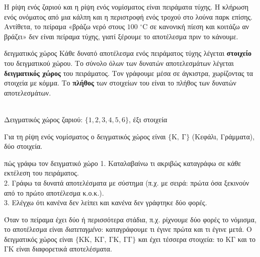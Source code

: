 Η ρίψη ενός ζαριού και η ρίψη ενός νομίσματος είναι πειράματα τύχης. Η κλήρωση ενός ονόματος από μια κάλπη και η περιστροφή ενός τροχού στο λούνα παρκ επίσης. Αντίθετα, το πείραμα «βράζω νερό στους $100$ $^\circ$C σε κανονική πίεση και κοιτάζω αν βράζει» δεν είναι πείραμα τύχης, γιατί ξέρουμε το αποτέλεσμα πριν το κάνουμε.

\begin{orismos}{δειγματικός χώρος}
Κάθε δυνατό αποτέλεσμα ενός πειράματος τύχης λέγεται \textbf{στοιχείο} του δειγματικού χώρου. Το σύνολο όλων των δυνατών αποτελεσμάτων λέγεται \textbf{δειγματικός χώρος} του πειράματος. Τον γράφουμε μέσα σε άγκιστρα, χωρίζοντας τα στοιχεία με κόμμα. Το \textbf{πλήθος} των στοιχείων του είναι το πλήθος των δυνατών αποτελεσμάτων.
\end{orismos}

\begin{center}
\hspace{0.5em}\hspace{0.5em}\hspace{0.5em}\hspace{0.5em}\hspace{0.5em}\\[1ex]
{\small Δειγματικός χώρος ζαριού: $\{1,2,3,4,5,6\}$, έξι στοιχεία}
\end{center}

Για τη ρίψη ενός νομίσματος ο δειγματικός χώρος είναι $\{\mathrm{Κ},\ \mathrm{Γ}\}$ (Κεφάλι, Γράμματα), δύο στοιχεία.

\begin{kanonas}{πώς γράφω τον δειγματικό χώρο}
1. Καταλαβαίνω τι ακριβώς καταγράφω σε κάθε εκτέλεση του πειράματος.\\
2. Γράφω τα δυνατά αποτελέσματα με σύστημα (π.χ. με σειρά: πρώτα όσα ξεκινούν από το πρώτο αποτέλεσμα κ.ο.κ.).\\
3. Ελέγχω ότι κανένα δεν λείπει και κανένα δεν γράφτηκε δύο φορές.
\end{kanonas}

Όταν το πείραμα έχει δύο ή περισσότερα στάδια, π.χ. ρίχνουμε δύο φορές το νόμισμα, το αποτέλεσμα είναι \emph{διατεταγμένο}: καταγράφουμε τι έγινε πρώτα και τι έγινε μετά. Ο δειγματικός χώρος είναι $\{\mathrm{ΚΚ},\ \mathrm{ΚΓ},\ \mathrm{ΓΚ},\ \mathrm{ΓΓ}\}$ και έχει τέσσερα στοιχεία: το $\mathrm{ΚΓ}$ και το $\mathrm{ΓΚ}$ είναι διαφορετικά αποτελέσματα.

